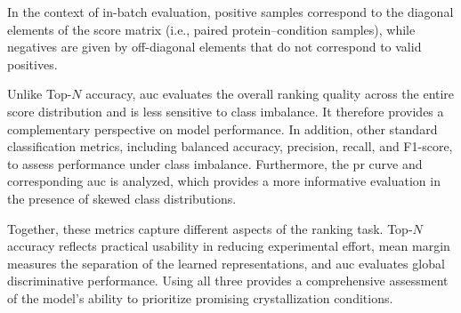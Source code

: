In the context of in-batch evaluation, positive samples correspond to the diagonal elements of the score matrix (i.e., paired protein--condition samples), while negatives are given by off-diagonal elements that do not correspond to valid positives.

Unlike Top-$N$ accuracy, \gls{auc} evaluates the overall ranking quality across the entire score distribution and is less sensitive to class imbalance. It therefore provides a complementary perspective on model performance.
In addition, other standard classification metrics, including balanced accuracy, precision, recall, and F1-score, to assess performance under class imbalance. Furthermore, the \gls{pr} curve and corresponding \gls{auc} is analyzed, which provides a more informative evaluation in the presence of skewed class distributions.

Together, these metrics capture different aspects of the ranking task. Top-$N$ accuracy reflects practical usability in reducing experimental effort, mean margin measures the separation of the learned representations, and \gls{auc} evaluates global discriminative performance. Using all three provides a comprehensive assessment of the model's ability to prioritize promising crystallization conditions.

















